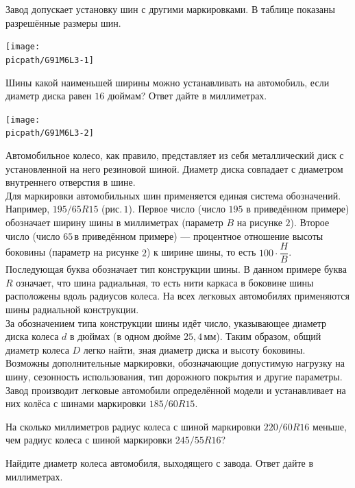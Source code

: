 \begin{class}[number=3]
	\begin{listofex}
		\item Завод допускает установку шин с другими маркировками. В таблице показаны разрешённые размеры шин.
		\begin{center}
			\texttt{[image: \\picpath/G91M6L3-1]}
		\end{center}
		Шины какой наименьшей ширины можно устанавливать на автомобиль, если диаметр диска равен \( 16 \) дюймам? Ответ дайте в миллиметрах.
		\begin{center}
			\texttt{[image: \\picpath/G91M6L3-2]}
		\end{center}
		Автомобильное колесо, как правило, представляет из себя металлический диск с установленной на него резиновой шиной. Диаметр диска совпадает с диаметром внутреннего отверстия в шине.\\
		Для маркировки автомобильных шин применяется единая система обозначений. Например, \( 195/65 R15 \) (рис. \( 1 \)). Первое число (число \( 195 \) в приведённом примере) обозначает ширину шины в миллиметрах (параметр \( B \) на рисунке \( 2 \)). Второе число (число \( 65 \) в приведённом примере)  — процентное отношение высоты боковины (параметр на рисунке \( 2 \)) к ширине шины, то есть \( 100\cdot\dfrac{H}{B} \). \\
		Последующая буква обозначает тип конструкции шины. В данном примере буква \( R \) означает, что шина радиальная, то есть нити каркаса в боковине шины расположены вдоль радиусов колеса. На всех легковых автомобилях применяются шины радиальной конструкции.\\		
		За обозначением типа конструкции шины идёт число, указывающее диаметр диска колеса \( d \) в дюймах (в одном дюйме \( 25,4 \) мм). Таким образом, общий диаметр колеса \( D \) легко найти, зная диаметр диска и высоту боковины.\\		
		Возможны дополнительные маркировки, обозначающие допустимую нагрузку на шину, сезонность использования, тип дорожного покрытия и другие параметры.		
		Завод производит легковые автомобили определённой модели и устанавливает на них колёса с шинами маркировки \( 185/60 R15 \).
		\item На сколько миллиметров радиус колеса с шиной маркировки \( 220/60 R16 \) меньше, чем радиус колеса с шиной маркировки \( 245/55 R16 \)?
		\item Найдите диаметр колеса автомобиля, выходящего с завода. Ответ дайте в миллиметрах.

\end{listofex}
\end{class}
